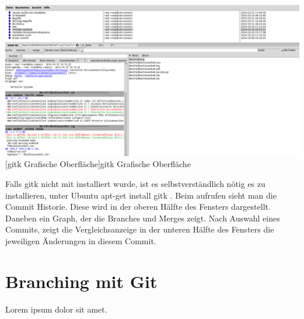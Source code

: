 \documentclass[12pt,a4paper,bibliography=totocnumbered,listof=totocnumbered]{scrartcl}
\begin{document}
\vspace{3pt}
\begin{minipage}{\linewidth}
	\centering
	\includegraphics[width=0.9\linewidth]{Bilder/gitk.png}
	[gitk Grafische Oberfläche]{gitk Grafische Oberfläche}
	\label{fig:osgi}
\end{minipage}
Falls gitk nicht mit installiert wurde, ist es selbstverständlich nötig es zu installieren, unter Ubuntu apt-get install gitk .
Beim aufrufen sieht man die Commit Historie. Diese wird in der oberen Hälfte des Fensters dargestellt. Daneben ein Graph, der die Branches und Merges zeigt. Nach Auswahl eines Commits, zeigt die Vergleichsanzeige in der unteren Hälfte des Fensters die jeweiligen Änderungen in diesem Commit.
\newpage




\section{Branching mit Git}
Lorem ipsum dolor sit amet.
\end{document}
